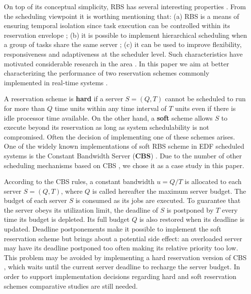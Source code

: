 \documentclass[times, 10pt,twocolumn]{article}
\begin{document}
On top of its conceptual simplicity, RBS has several interesting
properties \cite{steffens.ea03:resource}. From the scheduling
viewpoint it is worthing mentioning that: (a) RBS is a means of
ensuring temporal isolation since task execution can be controlled
within its reservation envelope
\cite{abeni.ea04:resource,mercer.ea94:processor,sprunt.ea89:aperiodic,spuri.ea96:scheduling};
(b) it is possible to implement hierarchical scheduling when a group
of tasks share the same server
\cite{davis.ea05:hierarchical,davis.ea08:investigation}; (c) it can be
used to improve flexibility, responsiveness and adaptiveness at the
scheduler level.  Such characteristics have motivated considerable
research in the area
\cite{abeni.ea99:adaptive,caccamo.ea00:capacity,caccamo.ea05:efficient,oliveira.ea08:dynamic,oliveira.ea09:dynamic,lin.ea05:improving}.
In this paper we aim at better characterizing the performance of two
reservation schemes commonly implemented in real-time systems
\cite{perng.ea06:real}.

A reservation scheme is \textbf{hard} if a server $S = (Q,T)$ cannot
be scheduled to run for more than $Q$ time units within any time
interval of $T$ units even if there is idle processor time
available. On the other hand, a \textbf{soft} scheme allows $S$ to
execute beyond its reservation as long as system schedulability is not
compromised. Often the decision of implementing one of these schemes
arises. One of the widely known implementations of soft RBS scheme in
EDF scheduled systems is the Constant Bandwidth Server (\textbf{CBS})
\cite{abeni.ea04:resource}.  Due to the number of other scheduling
mechanisms based on CBS
\cite{abeni.ea05:qos,caccamo.ea00:capacity,caccamo.ea05:efficient,lipari.ea00:greedy},
we chose it as a case study in this paper.

According to the CBS rules, a constant bandwidth $u = Q/T$ is
allocated to each server $S = (Q,T)$, where $Q$ is called hereafter
the maximum server budget. The budget of each server $S$ is consumed
as its jobs are executed. To guarantee that the server obeys its
utilization limit, the deadline of $S$ is postponed by $T$ every time
its budget is depleted.  Its full budget $Q$ is also restored when its
deadline is updated.  Deadline postponements make it possible to
implement the soft reservation scheme but brings about a potential
side effect: an overloaded server may have its deadline postponed too
often making its relative priority too low.  This problem may be
avoided by implementing a hard reservation version of CBS
\cite{buttazzo05:soft}, which waits until the current server deadline
to recharge the server budget. In order to support implementation
decisions regarding hard and soft reservation schemes comparative
studies are still needed.
\end{document}
